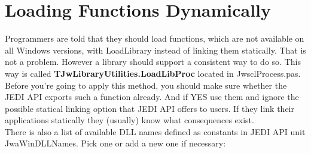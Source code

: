 \documentclass[a4paper,oneside,10pt]{article}
\begin{document}
\section{Loading Functions Dynamically}
Programmers are told that they should load functions, which are not available on all Windows versions, with LoadLibrary instead of linking them statically. That is not a problem. However a library should support a consistent way to do so. This way is called \textbf{TJwLibraryUtilities.LoadLibProc} located in JwsclProcess.pas.
Before you're going to apply this method, you should make sure whether the JEDI API exports such a function already. And if YES use them and ignore the possible statical linking option that JEDI API offers to users. If they link their applications statically they (usually) know what consequences exist.\\
There is also a list of available DLL names defined as constants in JEDI API unit JwaWinDLLNames. Pick one or add a new one if necessary:
\end{document}
